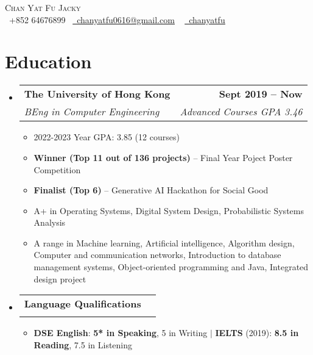 \documentclass[a4paper,11pt]{article}
\makeatletter
\newcommand{\resumeItem}[1]{
  \item\small{
    {#1 \vspace{-2pt}}
  }
}
\newcommand{\resumeSubheading}[4]{
  \vspace{-2pt}\item
  \begin{tabular*}{1.0\textwidth}[t]{l@{\extracolsep{\fill}}r}
    \textbf{#1} & \textbf{\small #2} \\
    \textit{\small#3} & \textit{\small #4} \\
  \end{tabular*}\vspace{-7pt}
}
\newcommand{\resumeSubHeadingListStart}{\begin{itemize}[leftmargin=0.0in, label={}]}
\newcommand{\resumeSubHeadingListEnd}{\end{itemize}}
\newcommand{\resumeItemListStart}{\begin{itemize}}
\newcommand{\resumeItemListEnd}{\end{itemize}\vspace{-5pt}}
\makeatother
\begin{document}
\begin{center}
  {\Huge \scshape Chan Yat Fu Jacky} \\ \vspace{5pt}
  \small \raisebox{-0.1\height}\faPhone\ +852 64676899~ \href{mailto:chanyatfu0616@gmail.com}{\raisebox{-0.2\height}\faEnvelope\  \underline{chanyatfu0616@gmail.com}} ~
  \href{https://github.com/chanyatfu}{\raisebox{-0.2\height}\faGithub\ \underline{chanyatfu}}
  \vspace{-8pt}
\end{center}

\vspace{-16pt}
\section{Education}
\resumeSubHeadingListStart

\resumeSubheading
{The University of Hong Kong}{Sept 2019 -- Now}{BEng in Computer Engineering}{Advanced Courses GPA 3.46}
\resumeItemListStart
\resumeItem{2022-2023 Year GPA: 3.85 (12 courses)}
\resumeItem{\textbf{Winner (Top 11 out of 136 projects)} -- Final Year Poject Poster Competition}
\resumeItem{\textbf{Finalist (Top 6)} -- Generative AI Hackathon for Social Good}
\resumeItem{A+ in Operating Systems, Digital System Design, Probabilistic Systems Analysis}
\resumeItem{A range in Machine learning, Artificial intelligence, Algorithm design, Computer and communication networks, Introduction to database management systems, Object-oriented programming and Java, Integrated design project}
\resumeItemListEnd

\vspace*{-4pt}

\resumeSubheading{Language Qualifications}{}{}{}\vspace*{-18pt}
\resumeItemListStart
\resumeItem{\textbf{DSE English}: \textbf{5* in Speaking}, 5 in Writing $|$ \textbf{IELTS} (2019): \textbf{8.5 in Reading}, 7.5 in Listening}
\resumeItemListEnd

\resumeSubHeadingListEnd
\vspace{-16pt}
\end{document}
